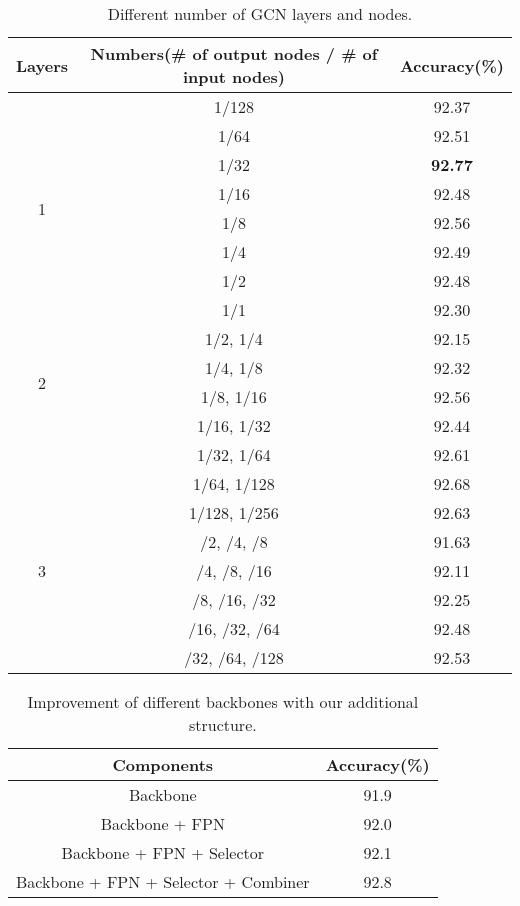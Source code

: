\documentclass[conference]{IEEEtran}
\begin{document}
\begin{table}[!tp]
\caption{Different number of GCN layers and nodes.}
\begin{center}
\begin{tabular}{|c|c|c|}
\hline
Layers & Numbers(\# of output nodes / \# of input nodes) & Accuracy(\%) \\ 
\hline
\multirow{8}{*}{1} & 1/128 & 92.37 \\ \cline{2-3}
                   & 1/64 & 92.51 \\ \cline{2-3}
                   & 1/32 & \textbf{92.77}  \\ \cline{2-3}
                   & 1/16 & 92.48 \\ \cline{2-3}
                   & 1/8 & 92.56 \\ \cline{2-3}
                   & 1/4 & 92.49 \\ \cline{2-3}
                   & 1/2 & 92.48 \\ \cline{2-3}
                   & 1/1 & 92.30 \\ 
\hline
\multirow{4}{*}{2} & 1/2, 1/4 & 92.15 \\ \cline{2-3}
                    & 1/4, 1/8 & 92.32 \\ \cline{2-3}
                    & 1/8, 1/16 & 92.56 \\ \cline{2-3}
                    & 1/16, 1/32 & 92.44 \\ \cline{2-3}
                    & 1/32, 1/64 & 92.61 \\ \cline{2-3}
                    & 1/64, 1/128 & 92.68 \\ \cline{2-3}
                    & 1/128, 1/256 & 92.63 \\
\hline
\multirow{3}{*}{3} & /2, /4, /8 & 91.63 \\ \cline{2-3}
                   & /4, /8, /16 & 92.11 \\ \cline{2-3}
                   & /8, /16, /32 & 92.25 \\ \cline{2-3}
                   & /16, /32, /64 & 92.48 \\ \cline{2-3}
                   & /32, /64, /128 & 92.53 \\
\hline


\end{tabular}
\label{tab8}
\end{center}
\end{table}


\begin{table}[!tp]
\caption{ Improvement of different backbones with our additional structure.}
\begin{center}
\begin{tabular}{|c|c|}
\hline
Components & Accuracy(\%) \\
\hline
Backbone & 91.9 \\ \hline
Backbone + FPN & 92.0 \\ \hline
Backbone + FPN + Selector & 92.1 \\ \hline
Backbone + FPN + Selector + Combiner & 92.8 \\ \hline
\end{tabular}
\label{tab9}
\end{center}
\end{table}
\end{document}

